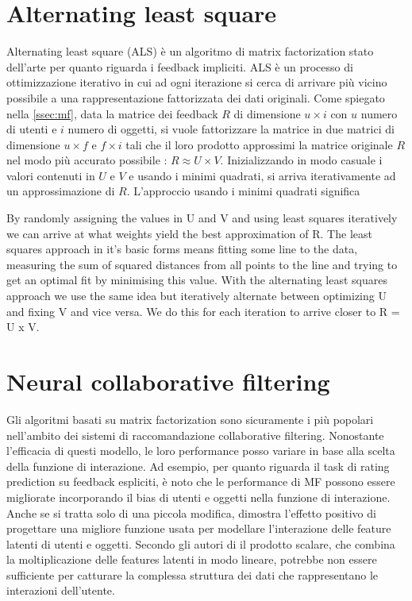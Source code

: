 \documentclass[12pt,italian]{report}
\begin{document}
\section{Alternating least square}
Alternating least square (ALS) \cite{als} è un algoritmo di matrix factorization stato dell'arte per quanto riguarda i feedback impliciti. ALS è un processo di ottimizzazione iterativo in cui ad ogni iterazione si cerca di arrivare più vicino possibile a una rappresentazione fattorizzata dei dati originali. 
Come spiegato nella \autoref{ssec:mf}, data la matrice dei feedback $R$ di dimensione $u \times i$ con $u$ numero di utenti e $i$ numero di oggetti, si vuole fattorizzare la matrice in due matrici di dimensione $u \times f$ e $f \times i$ tali che il loro prodotto approssimi la matrice originale $R$ nel modo più accurato possibile : $R \approx U \times V$.
Inizializzando in modo casuale i valori contenuti in $U$ e $V$ e usando i minimi quadrati, si arriva iterativamente ad un approssimazione di $R$. L'approccio usando i minimi quadrati significa

By randomly assigning the values in U and V and using least squares iteratively we can arrive at what weights yield the best approximation of R. The least squares approach in it’s basic forms means fitting some line to the data, measuring the sum of squared distances from all points to the line and trying to get an optimal fit by minimising this value.
With the alternating least squares approach we use the same idea but iteratively alternate between optimizing U and fixing V and vice versa. We do this for each iteration to arrive closer to R = U x V.



\section{Neural collaborative filtering}
Gli algoritmi basati su matrix factorization sono sicuramente i più popolari nell'ambito dei sistemi di raccomandazione collaborative filtering. Nonostante l'efficacia di questi modello, le loro performance  posso variare in base alla scelta della funzione di interazione. Ad esempio, per quanto riguarda il task di rating prediction su feedback espliciti, è noto che le performance di MF possono essere migliorate incorporando il bias di utenti e oggetti nella funzione di interazione. Anche se si tratta solo di una piccola modifica, dimostra l'effetto positivo di progettare una migliore funzione usata per modellare l'interazione delle feature latenti di utenti e oggetti. 
Secondo gli autori di \cite{NCF} il prodotto scalare, che combina la moltiplicazione delle features latenti in modo lineare, potrebbe non essere sufficiente per catturare la complessa struttura dei dati che rappresentano le interazioni dell'utente. 
\end{document}
